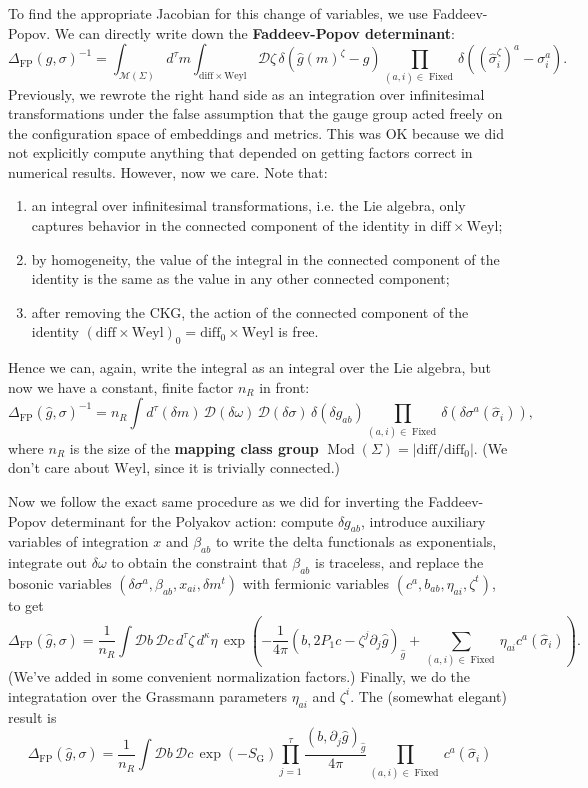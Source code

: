 \documentclass{report}
\theoremstyle{plain}
\theoremstyle{definition}
\theoremstyle{remark}
\newcommand{\di}{\partial}
\newcommand{\cD}{\mathcal{D}}
\newcommand{\cM}{\mathcal{M}}
\newcommand{\diff}{\mathrm{diff}}
\newcommand{\Weyl}{\mathrm{Weyl}}
\DeclareMathOperator{\Mod}{Mod}
\DeclareMathOperator{\Fixed}{Fixed}
\begin{document}
To find the appropriate Jacobian for this change of variables, we use
Faddeev-Popov. We can directly write down the {\bf Faddeev-Popov
  determinant}:
\[ \Delta_{\text{FP}}(g, \sigma)^{-1} = \int_{\cM(\Sigma)} d^\tau m \int_{\diff \times \Weyl} \cD \zeta \, \delta(\hat{g}(m)^\zeta - g) \prod_{(a, i) \in \Fixed} \delta((\hat{\sigma}_i^\zeta)^a - \sigma_i^a). \]
Previously, we rewrote the right hand side as an integration over
infinitesimal transformations under the false assumption that the
gauge group acted freely on the configuration space of embeddings and
metrics. This was OK because we did not explicitly compute anything
that depended on getting factors correct in numerical results.
However, now we care. Note that:
\begin{enumerate}
\item an integral over infinitesimal transformations, i.e. the Lie
  algebra, only captures behavior in the connected component of the
  identity in $\diff \times \Weyl$;
\item by homogeneity, the value of the integral in the connected
  component of the identity is the same as the value in any other
  connected component;
\item after removing the CKG, the action of the connected component of
  the identity $(\diff \times \Weyl)_0 = \diff_0 \times \Weyl$ is free.
\end{enumerate}
Hence we can, again, write the integral as an integral over the Lie
algebra, but now we have a constant, finite factor $n_R$ in front:
\[ \Delta_{\text{FP}}(\hat{g}, \sigma)^{-1} = n_R \int d^\tau (\delta m) \, \cD(\delta \omega) \, \cD(\delta \sigma) \, \delta(\delta g_{ab}) \prod_{(a,i) \in \Fixed} \delta(\delta \sigma^a(\hat{\sigma}_i)), \]
where $n_R$ is the size of the {\bf mapping class group} $\Mod(\Sigma)
= |\diff/\diff_0|$. (We don't care about $\Weyl$, since it is
trivially connected.)

Now we follow the exact same procedure as we did for inverting the
Faddeev-Popov determinant for the Polyakov action: compute $\delta
g_{ab}$, introduce auxiliary variables of integration $x$ and
$\beta_{ab}$ to write the delta functionals as exponentials, integrate
out $\delta \omega$ to obtain the constraint that $\beta_{ab}$ is
traceless, and replace the bosonic variables $(\delta \sigma^a,
\beta_{ab}, x_{ai}, \delta m^t)$ with fermionic variables $(c^a,
b_{ab}, \eta_{ai}, \zeta^t)$, to get
\[ \Delta_{\text{FP}}(\hat{g}, \sigma) = \frac{1}{n_R} \int \cD b \, \cD c \, d^\tau \zeta \, d^\kappa \eta \, \exp\left(-\frac{1}{4\pi} (b, 2P_1 c - \zeta^j \di_j \hat{g})_{\hat{g}} + \sum_{(a,i) \in \Fixed} \eta_{ai} c^a(\hat{\sigma}_i)\right). \]
(We've added in some convenient normalization factors.) Finally, we do
the integratation over the Grassmann parameters $\eta_{ai}$ and
$\zeta^i$. The (somewhat elegant) result is
\[ \Delta_{\text{FP}}(\hat{g}, \sigma) = \frac{1}{n_R} \int \cD b \, \cD c \, \exp(-S_{\text{G}}) \prod_{j=1}^\tau \frac{(b, \di_j \hat{g})_{\hat{g}}}{4\pi} \prod_{(a,i) \in \Fixed} c^a(\hat{\sigma}_i) \]
\end{document}
